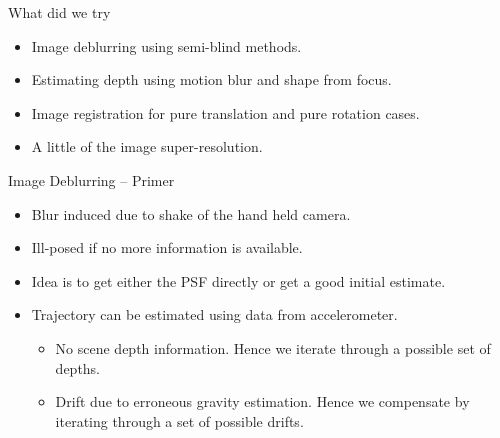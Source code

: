 \documentclass{beamer}
\begin{document}
\begin{frame}{What did we try}
\begin{itemize}
	\item Image deblurring using semi-blind methods.
	\item Estimating depth using motion blur and shape from focus.
	\item Image registration for pure translation and pure rotation cases.
	\item A little of the image super-resolution.
\end{itemize}
\end{frame}

\begin{frame}{Image Deblurring -- Primer}
\begin{itemize}
	\item Blur induced due to shake of the hand held camera. 
	\item Ill-posed if no more information is available.
	\item Idea is to get either the PSF directly or get a good initial
	estimate.
	\item Trajectory can be estimated using data from accelerometer. 
	\begin{itemize}
	\item No scene depth information. Hence we iterate through a possible set of 
	depths. 
	\item Drift due to erroneous gravity estimation. Hence we compensate by
	iterating through a set of possible drifts.
	\end{itemize}
\end{itemize}
\end{frame}
\end{document}

